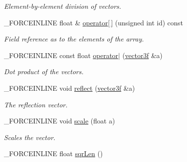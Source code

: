 \begin{DoxyCompactItemize}
\begin{DoxyCompactList}\small\item\em Element-\/by-\/element division of vectors. \end{DoxyCompactList}\item 
\hypertarget{classbt_1_1vector3f_a6dd5e81d230d1988ee499fb152b82cee}{\-\_\-\-F\-O\-R\-C\-E\-I\-N\-L\-I\-N\-E float \& \hyperlink{classbt_1_1vector3f_a6dd5e81d230d1988ee499fb152b82cee}{operator\mbox{[}$\,$\mbox{]}} (unsigned int id) const }\label{classbt_1_1vector3f_a6dd5e81d230d1988ee499fb152b82cee}

\begin{DoxyCompactList}\small\item\em Field reference as to the elements of the array. \end{DoxyCompactList}\item 
\hypertarget{classbt_1_1vector3f_ad95f30bdbcc492c0a70448a1b8b6196a}{\-\_\-\-F\-O\-R\-C\-E\-I\-N\-L\-I\-N\-E const float \hyperlink{classbt_1_1vector3f_ad95f30bdbcc492c0a70448a1b8b6196a}{operator$|$} (\hyperlink{classbt_1_1vector3f}{vector3f} \&a)}\label{classbt_1_1vector3f_ad95f30bdbcc492c0a70448a1b8b6196a}

\begin{DoxyCompactList}\small\item\em Dot product of the vectors. \end{DoxyCompactList}\item 
\hypertarget{classbt_1_1vector3f_a4f5e1a1c75d6ef76e66b706d012f1fdb}{\-\_\-\-F\-O\-R\-C\-E\-I\-N\-L\-I\-N\-E void \hyperlink{classbt_1_1vector3f_a4f5e1a1c75d6ef76e66b706d012f1fdb}{reflect} (\hyperlink{classbt_1_1vector3f}{vector3f} \&a)}\label{classbt_1_1vector3f_a4f5e1a1c75d6ef76e66b706d012f1fdb}

\begin{DoxyCompactList}\small\item\em The reflection vector. \end{DoxyCompactList}\item 
\hypertarget{classbt_1_1vector3f_a6aab0d4a36eb81c980896d6000ad2564}{\-\_\-\-F\-O\-R\-C\-E\-I\-N\-L\-I\-N\-E void \hyperlink{classbt_1_1vector3f_a6aab0d4a36eb81c980896d6000ad2564}{scale} (float a)}\label{classbt_1_1vector3f_a6aab0d4a36eb81c980896d6000ad2564}

\begin{DoxyCompactList}\small\item\em Scales the vector. \end{DoxyCompactList}\item 
\hypertarget{classbt_1_1vector3f_a3f460a9f850b239bb9857065ea86b5b9}{\-\_\-\-F\-O\-R\-C\-E\-I\-N\-L\-I\-N\-E float \hyperlink{classbt_1_1vector3f_a3f460a9f850b239bb9857065ea86b5b9}{sqr\-Len} ()}\label{classbt_1_1vector3f_a3f460a9f850b239bb9857065ea86b5b9}


\end{DoxyCompactItemize}
